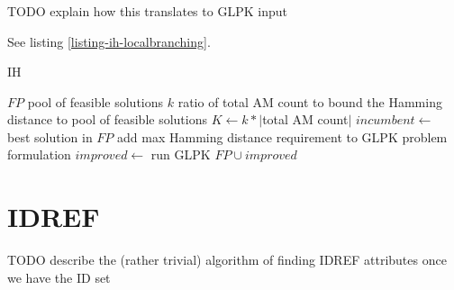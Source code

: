 \subsubsection{}

TODO explain how this translates to GLPK input

See listing \ref{listing-ih-localbranching}.

\begin{algorithm}
\caption{ IH}
\label{listing-ih-localbranching}
\begin{algorithmic}
\REQUIRE $FP$ pool of feasible solutions
\REQUIRE $k$ ratio of total AM count to bound the Hamming distance to
\ENSURE pool of feasible solutions
\STATE $K \gets k * |$total AM count$|$
\STATE $incumbent \gets $ best solution in $FP$ 
\STATE add max Hamming distance requirement to GLPK problem formulation
\STATE $improved \gets $ run GLPK
\RETURN $FP \cup improved$
\end{algorithmic}
\end{algorithm}

\section{IDREF}

TODO describe the (rather trivial) algorithm of finding IDREF attributes once we have the ID set

